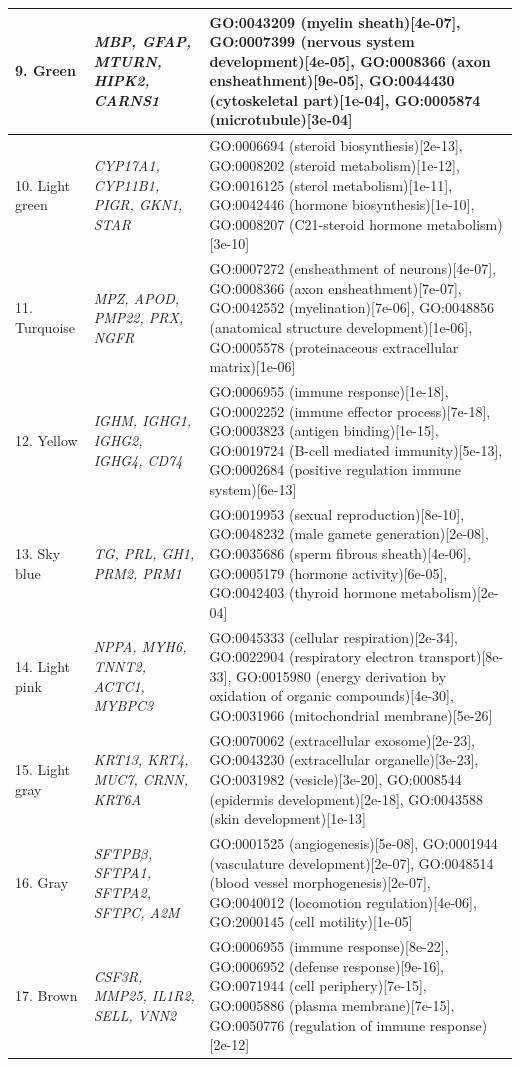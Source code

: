 \documentclass[10pt,letterpaper]{article}
\begin{document}
\begin{table}[!hp]
\begin{adjustwidth}{-2in}{0in}
\begin{tabular}{|p{1.0in}|p{1.5in}|p{4.5in}|}
9. Green & \textit{MBP, GFAP, MTURN, HIPK2, CARNS1} & GO:0043209 (myelin sheath)[4e-07], GO:0007399 (nervous system development)[4e-05], GO:0008366 (axon ensheathment)[9e-05], GO:0044430 (cytoskeletal part)[1e-04], GO:0005874 (microtubule)[3e-04] \\ \hline
10. Light green & \textit{CYP17A1, CYP11B1, PIGR, GKN1, STAR} & GO:0006694 (steroid biosynthesis)[2e-13], GO:0008202 (steroid metabolism)[1e-12], GO:0016125 (sterol metabolism)[1e-11], GO:0042446 (hormone biosynthesis)[1e-10], GO:0008207 (C21-steroid hormone metabolism)[3e-10] \\ \hline
11. Turquoise & \textit{MPZ, APOD, PMP22, PRX, NGFR} & GO:0007272 (ensheathment of neurons)[4e-07], GO:0008366 (axon ensheathment)[7e-07], GO:0042552 (myelination)[7e-06], GO:0048856 (anatomical structure development)[1e-06], GO:0005578 (proteinaceous extracellular matrix)[1e-06] \\ \hline
12. Yellow & \textit{IGHM, IGHG1, IGHG2, IGHG4, CD74} & GO:0006955 (immune response)[1e-18], GO:0002252 (immune effector process)[7e-18], GO:0003823 (antigen binding)[1e-15], GO:0019724 (B-cell mediated immunity)[5e-13], GO:0002684 (positive regulation immune system)[6e-13] \\ \hline
13. Sky blue & \textit{TG, PRL, GH1, PRM2, PRM1} & GO:0019953 (sexual reproduction)[8e-10], GO:0048232 (male gamete generation)[2e-08], GO:0035686 (sperm fibrous sheath)[4e-06], GO:0005179 (hormone activity)[6e-05], GO:0042403 (thyroid hormone metabolism)[2e-04] \\ \hline
14. Light pink & \textit{NPPA, MYH6, TNNT2, ACTC1, MYBPC3} & GO:0045333 (cellular respiration)[2e-34], GO:0022904 (respiratory electron transport)[8e-33], GO:0015980 (energy derivation by oxidation of organic compounds)[4e-30], GO:0031966 (mitochondrial membrane)[5e-26] \\ \hline
15. Light gray & \textit{KRT13, KRT4, MUC7, CRNN, KRT6A} & GO:0070062 (extracellular exosome)[2e-23], GO:0043230 (extracellular organelle)[3e-23], GO:0031982 (vesicle)[3e-20], GO:0008544 (epidermis development)[2e-18], GO:0043588 (skin development)[1e-13] \\ \hline
16. Gray & \textit{SFTPB$\beta$, SFTPA1, SFTPA2, SFTPC, A2M} & GO:0001525 (angiogenesis)[5e-08], GO:0001944 (vasculature development)[2e-07], GO:0048514 (blood vessel morphogenesis)[2e-07], GO:0040012 (locomotion regulation)[4e-06], GO:2000145 (cell motility)[1e-05] \\ \hline
17. Brown & \textit{CSF3R, MMP25, IL1R2, SELL, VNN2} & GO:0006955 (immune response)[8e-22], GO:0006952 (defense response)[9e-16], GO:0071944 (cell periphery)[7e-15], GO:0005886 (plasma membrane)[7e-15], GO:0050776 (regulation of immune response)[2e-12]\\ \hline

\end{tabular}
\end{adjustwidth}
\end{table}
\end{document}
